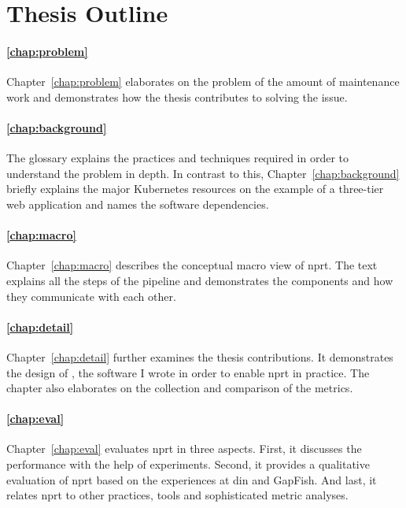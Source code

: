 \section{Thesis Outline}

\paragraph{\ref{chap:problem} }
Chapter~\ref{chap:problem} elaborates on the problem of the amount of maintenance work and
demonstrates how the thesis contributes to solving the issue.

\paragraph{\ref{chap:background} }
The glossary explains the practices and techniques required in order to understand the
problem in depth. In contrast to this, Chapter~\ref{chap:background} briefly explains the
major Kubernetes resources on the example of a three-tier web application and names the software
dependencies.

\paragraph{\ref{chap:macro} }
Chapter~\ref{chap:macro} describes the conceptual macro view of \gls{nprt}. The text explains
 all the steps of the pipeline and demonstrates the components and how they
communicate with each other.

\paragraph{\ref{chap:detail} }
Chapter~\ref{chap:detail} further examines the thesis contributions. It
demonstrates the design of \deployer{}, the software I wrote in order to enable \gls{nprt}
in practice. The chapter also elaborates on the collection and comparison of the metrics.

\paragraph{\ref{chap:eval} }
Chapter~\ref{chap:eval} evaluates \gls{nprt} in three aspects. First, it discusses the
performance with the help of experiments. Second, it provides a qualitative evaluation
of \gls{nprt} based on the experiences at \gls{din} and GapFish. And last, it relates
\gls{nprt} to other practices, tools and sophisticated metric analyses.

